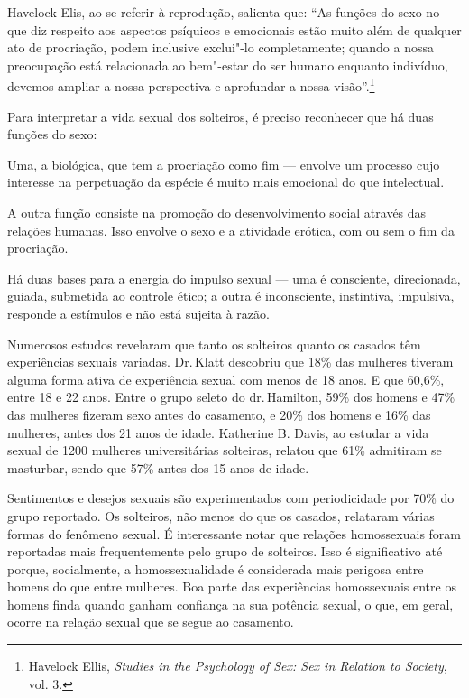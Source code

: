 Havelock Elis, ao se referir à reprodução, salienta que: ``As funções do
sexo no que diz respeito aos aspectos psíquicos e emocionais estão muito
além de qualquer ato de procriação, podem inclusive exclui"-lo
completamente; quando a nossa preocupação está relacionada ao
bem"-estar do ser humano enquanto indivíduo, devemos ampliar a nossa
perspectiva e aprofundar a nossa visão''.\footnote{Havelock Ellis,
  \emph{Studies in the Psychology of Sex: Sex in Relation to Society},
  vol. 3.}

Para interpretar a vida sexual dos solteiros, é preciso reconhecer que
há duas funções do sexo:

Uma, a biológica, que tem a procriação como fim --- envolve um processo cujo
interesse na perpetuação da espécie é muito mais emocional do que
intelectual.

A outra função consiste na promoção do desenvolvimento social através
das relações humanas. Isso envolve o sexo e a atividade erótica, com ou
sem o fim da procriação.

Há duas bases para a energia do impulso sexual --- uma é consciente,
direcionada, guiada, submetida ao controle ético; a outra é
inconsciente, instintiva, impulsiva, responde a estímulos e não está
sujeita à razão.


Numerosos estudos revelaram que tanto os solteiros quanto os casados
têm experiências sexuais variadas. Dr.\,Klatt descobriu que 18\% das
mulheres tiveram alguma forma ativa de experiência sexual com menos de
18 anos. E que 60,6\%, entre 18 e 22 anos. Entre o grupo seleto do dr.\,Hamilton, 59\% dos homens e 47\% das mulheres fizeram sexo antes do
casamento, e 20\% dos homens e 16\% das mulheres, antes dos 21 anos de
idade. Katherine B. Davis, ao estudar a vida sexual de 1200 mulheres
universitárias solteiras, relatou que 61\% admitiram se masturbar, sendo
que 57\% antes dos 15 anos de idade.

Sentimentos e desejos sexuais são experimentados com periodicidade por
70\% do grupo reportado. Os solteiros, não menos do que os
casados, relataram várias formas do fenômeno sexual. É interessante
notar que relações homossexuais foram reportadas mais frequentemente
pelo grupo de solteiros. Isso é significativo até porque, socialmente, a
homossexualidade é considerada mais perigosa entre homens do que entre
mulheres. Boa parte das experiências homossexuais entre os homens finda
quando ganham confiança na sua potência sexual, o que, em geral, ocorre na relação sexual que se segue ao casamento.

